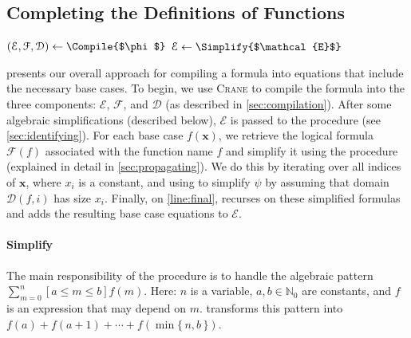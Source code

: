 \documentclass[a4paper,UKenglish,cleveref, autoref, thm-restate]{lipics-v2021}
\begin{document}
\subsection{Completing the Definitions of Functions}\label{sec:completing}

\begin{algorithm}[t]
  \caption{\protect\CompileWithBaseCases{$\phi$}}\label{alg:compilewithbasecases}
  $(\mathcal{E}, \mathcal{F}, \mathcal{D}) \gets \Compile{$\phi$}$\;
  $\mathcal{E} \gets \Simplify{$\mathcal{E}$}$\;\label{line:second}
\end{algorithm}

 presents our overall approach for compiling a
formula into equations that include the necessary base cases. To begin, we use
\textsc{Crane} to compile the formula into the three components: $\mathcal{E}$,
$\mathcal{F}$, and $\mathcal{D}$ (as described in \cref{sec:compilation}). After
some algebraic simplifications (described below), $\mathcal{E}$ is passed to the
\FindBaseCases procedure (see \cref{sec:identifying}). For each base case
$f(\mathbf{x})$, we retrieve the logical formula $\mathcal{F}(f)$ associated
with the function name $f$ and simplify it using the \Propagate procedure
(explained in detail in \cref{sec:propagating}). We do this by iterating over
all indices of $\mathbf{x}$, where $x_{i}$ is a constant, and using \Propagate
to simplify $\psi$ by assuming that domain $\mathcal{D}(f, i)$ has size $x_{i}$.
Finally, on \autoref{line:final}, \CompileWithBaseCases recurses on these
simplified formulas and adds the resulting base case equations to $\mathcal{E}$.

\paragraph*{Simplify}
The main responsibility of the \Simplify procedure is to handle the algebraic
pattern $\sum_{m=0}^{n}[a \le m \le b] f(m)$. Here: $n$ is a variable,
$a, b \in \mathbb{N}_{0}$ are constants, and $f$ is an expression that may
depend on $m$. \Simplify transforms this pattern into
$f(a) + f(a+1) + \cdots + f(\min\{\, n, b \,\})$.
\end{document}
